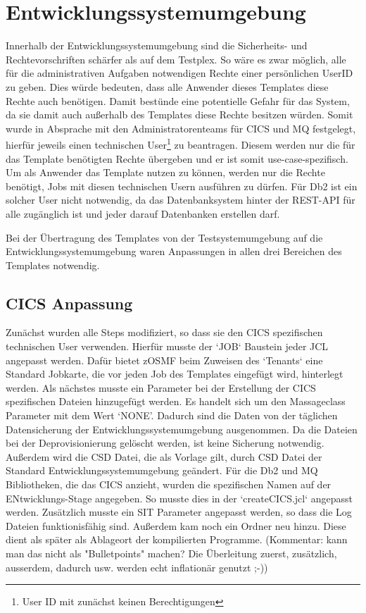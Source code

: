 \section{Entwicklungssystemumgebung}
Innerhalb der Entwicklungssystemumgebung sind die Sicherheits- und Rechtevorschriften schärfer als auf dem Testplex.
So wäre es zwar möglich, alle für die administrativen Aufgaben notwendigen Rechte einer persönlichen UserID zu geben.
Dies würde bedeuten, dass alle Anwender dieses Templates diese Rechte auch benötigen.
Damit bestünde eine potentielle Gefahr für das System, da sie damit auch außerhalb des Templates diese Rechte besitzen würden.
Somit wurde in Absprache mit den Administratorenteams für CICS und MQ festgelegt, hierfür jeweils einen technischen User\footnote{User ID mit zunächst keinen Berechtigungen} zu beantragen.
Diesem werden nur die für das Template benötigten Rechte übergeben und er ist somit use-case-spezifisch.
Um als Anwender das Template nutzen zu können, werden nur die Rechte benötigt, Jobs mit diesen technischen Usern ausführen zu dürfen.
Für Db2 ist ein solcher User nicht notwendig, da das Datenbanksystem hinter der REST-API für alle zugänglich ist und jeder darauf Datenbanken erstellen darf.

Bei der Übertragung des Templates von der Testsystemumgebung auf die Entwicklungssystemumgebung waren Anpassungen in allen drei Bereichen des Templates notwendig.

\subsection{CICS Anpassung}
Zunächst wurden alle Steps modifiziert, so dass sie den CICS spezifischen technischen User verwenden.
Hierfür musste der `JOB` Baustein jeder JCL angepasst werden.
Dafür bietet zOSMF beim Zuweisen des `Tenants` eine Standard Jobkarte, die vor jeden Job des Templates eingefügt wird, hinterlegt werden.
Als nächstes musste ein Parameter bei der Erstellung der CICS spezifischen Dateien hinzugefügt werden.
Es handelt sich um den Massageclass Parameter mit dem Wert `NONE'.
Dadurch sind die Daten von der täglichen Datensicherung der Entwicklungssystemumgebung ausgenommen.
Da die Dateien bei der Deprovisionierung gelöscht werden, ist keine Sicherung notwendig.
Außerdem wird die CSD Datei, die als Vorlage gilt, durch CSD Datei der Standard Entwicklungssystemumgebung geändert.
Für die Db2 und MQ Bibliotheken, die das CICS anzieht, wurden die spezifischen Namen auf der ENtwicklungs-Stage angegeben.
So musste dies in der `createCICS.jcl` angepasst werden.
Zusätzlich musste ein SIT Parameter angepasst werden, so dass die Log Dateien funktionisfähig sind.
Außerdem kam noch ein Ordner neu hinzu.
Diese dient als später als Ablageort der kompilierten Programme. (Kommentar: kann man das nicht als "Bulletpoints" machen? Die Überleitung zuerst, zusätzlich, ausserdem, dadurch usw. werden echt inflationär genutzt ;-))

